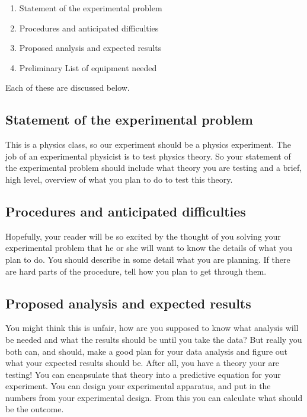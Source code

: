 \begin{enumerate}
\item Statement of the experimental problem

\item Procedures and anticipated difficulties

\item Proposed analysis and expected results

\item Preliminary List of equipment needed
\end{enumerate}

Each of these are discussed below.

\subsection{Statement of the experimental problem}

This is a physics class, so our experiment should be a physics experiment.
The job of an experimental physicist is to test physics theory. So your
statement of the experimental problem should include what theory you are
testing and a brief, high level, overview of what you plan to do to test
this theory.

\subsection{Procedures and anticipated difficulties}

Hopefully, your reader will be so excited by the thought of you solving your
experimental problem that he or she will want to know the details of what
you plan to do. You should describe in some detail what you are planning. If
there are hard parts of the procedure, tell how you plan to get through them.

\subsection{Proposed analysis and expected results}

You might think this is unfair, how are you supposed to know what analysis
will be needed and what the results should be until you take the data? But
really you both can, and should, make a good plan for your data analysis and
figure out what your expected results should be. After all, you have a
theory your are testing! You can encapsulate that theory into a predictive
equation for your experiment. You can design your experimental apparatus,
and put in the numbers from your experimental design. From this you can
calculate what should be the outcome.

